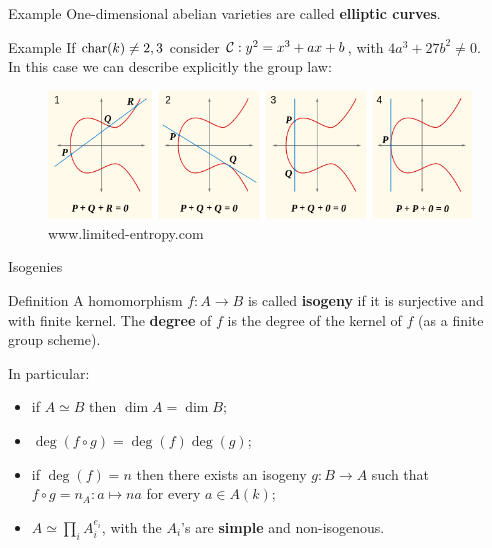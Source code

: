 \documentclass{beamer}
\begin{document}
\begin{frame}{Example}
    One-dimensional abelian varieties are called \textbf{elliptic curves}.
\pause    
  \begin{exampleblock}{Example}
    If $\operatorname{char}(k) \neq 2,3$ consider ${\mathcal C}: y^2=x^3+ax+b$, with $4a^3+27b^2 \neq 0$.\\
    In this case we can describe explicitly the group law:\\
    \begin{figure}
        \includegraphics[width=1\textwidth]{ECgrouplaw}
        \caption{www.limited-entropy.com}
    \end{figure}
  \end{exampleblock}
\end{frame}

\begin{frame}{Isogenies}
  \begin{block}{Definition}
    A homomorphism $f:A\to B$ is called \textbf{isogeny} if it is surjective and with finite kernel. The \textbf{degree} of $f$ is the degree of the kernel of $f$ (as a finite group scheme).
  \end{block}
\pause
  In particular:
  \begin{itemize}
    \item if $A\simeq B$ then $\dim A = \dim B$;
    \item $\deg(f\circ g) = \deg(f)\deg(g)$;
    \item if $\deg(f)=n$ then there exists an isogeny $g:B \to A$ such that $f\circ g = n_A: a \mapsto na$ for every $a\in A(k)$;
    \item $A\simeq \prod_i A_i^{e_i}$, with the $A_i$'s are \textbf{simple} and non-isogenous.
  \end{itemize}
\end{frame}
\end{document}
